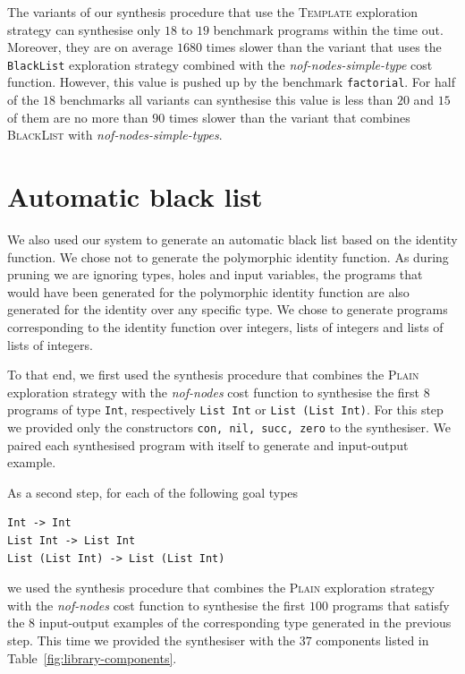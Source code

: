 The variants of our synthesis procedure that use the \textsc{Template} exploration strategy can synthesise only $18$ to $19$ benchmark programs within the time out. Moreover, they are on average $1680$ times slower than the variant that uses the \lstinline?BlackList? exploration strategy combined with the \textit{nof-nodes-simple-type} cost function. However, this value is pushed up by the benchmark \lstinline?factorial?. For half of the $18$ benchmarks all variants can synthesise this value is less than $20$ and $15$ of them are no more than $90$ times slower than the variant that combines \textsc{BlackList} with \textit{nof-nodes-simple-types}.


\section{Automatic black list}\label{Black list generation}
We also used our system to generate an automatic black list based on the identity function. We chose not to generate the polymorphic identity function. As during pruning we are ignoring types, holes and input variables, the programs that would have been generated for the polymorphic identity function are also generated for the identity over any specific type. We chose to generate programs corresponding to the identity function over integers, lists of integers and lists of lists of integers.

To that end, we first used the synthesis procedure that combines the \textsc{Plain} exploration strategy with the \textit{nof-nodes} cost function to synthesise the first $8$ programs of type \lstinline?Int?, respectively \lstinline?List Int? or \lstinline?List (List Int)?. For this step we provided only the constructors \lstinline?con, nil, succ, zero? to the synthesiser. We paired each synthesised program with itself to generate and input-output example.

As a second step, for each of the following goal types
\begin{lstlisting}[style=plain]
Int -> Int
List Int -> List Int
List (List Int) -> List (List Int)
\end{lstlisting}
we used the synthesis procedure that combines the \textsc{Plain} exploration strategy with the \textit{nof-nodes} cost function to synthesise the first $100$ programs that satisfy the $8$ input-output examples of the corresponding type generated in the previous step. This time we provided the synthesiser with the $37$ components listed in Table~\ref{fig:library-components}.

